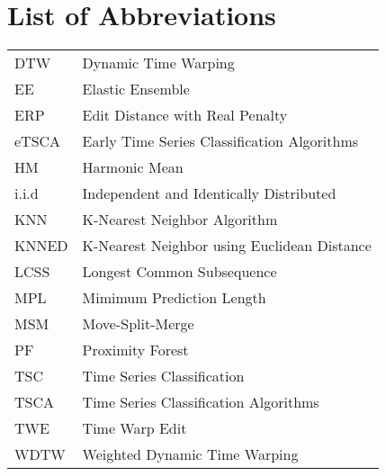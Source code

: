 \section*{List of Abbreviations}


\begin{table}[h!]
\begin{tabular}{ll}
DTW   & Dynamic Time Warping\\
EE   & Elastic Ensemble\\
ERP   & Edit Distance with Real Penalty\\
eTSCA   & Early Time Series Classification Algorithms\\
HM   & Harmonic Mean\\
i.i.d   & Independent and Identically Distributed\\
KNN   & K-Nearest Neighbor Algorithm\\
KNNED   & K-Nearest Neighbor using Euclidean Distance\\
LCSS   & Longest Common Subsequence\\
MPL   & Mimimum Prediction Length\\
MSM   & Move-Split-Merge\\
PF   & Proximity Forest\\
TSC   & Time Series Classification\\
TSCA   & Time Series Classification Algorithms\\
TWE   & Time Warp Edit\\
WDTW   & Weighted Dynamic Time Warping
\end{tabular}
\end{table}

\null\newpage

